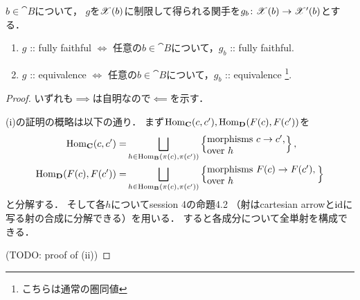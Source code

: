 \documentclass[a4paper, dvipdfmx]{jsarticle}
\begin{document}
    \begin{Prop}
        $b \in \cat{B}$について，
        $g$を$\mathscr{X}(b)$に制限して得られる関手を$g_b \colon \mathscr{X}(b) \to \mathscr{X}'(b)$とする．
        \begin{enumerate}[label=(\alph*)]
        \item $g$ :: fully faithful
                $\iff$ 任意の$b \in \cat{B}$について，$g_{b}$ :: fully faithful.
        \item $g$ :: equivalence
                $\iff$ 任意の$b \in \cat{B}$について，$g_{b}$ :: equivalence
                    \footnote{こちらは通常の圏同値}.
    \end{enumerate}
    \end{Prop}
    \begin{proof}
        いずれも$\implies$は自明なので$\impliedby$を示す．

        (i)の証明の概略は以下の通り．
        まず$\operatorname{Hom}_{\mathbf{C}}(c, c'), \operatorname{Hom}_{\mathbf{D}}(F(c), F(c'))$を
        \begin{align*}
            \Hom_{\cat{C}}(c, c')
            =&\bigsqcup_{h \in \Hom_{\cat{B}}(\pi(c), \pi(c'))}
            \left\{\parbox{2.85cm}{morphisms $c \to c'$, \\ \qquad\ \ over $h$}\right\}, \\
            \Hom_{\cat{D}}(F(c), F(c'))
            =&\bigsqcup_{h \in \Hom_{\cat{B}}(\pi(c), \pi(c'))}
            \left\{\parbox{4cm}{morphisms $F(c) \to F(c')$, \\ \qquad\qquad\ over $h$}\right\}
        \end{align*}
        と分解する．
        そして各$h$についてsession 4の命題4.2
        （射はcartesian arrowと$\mathrm{id}_{\!}$に写る射の合成に分解できる）を用いる．
        すると各成分について全単射を構成できる．

        (TODO: proof of (ii))
    \end{proof}





\end{document}
